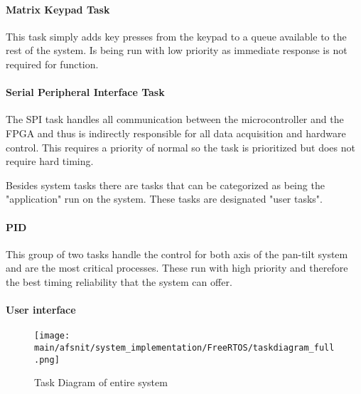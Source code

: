 \documentclass[../../../main]{subfiles}
\begin{document}
\paragraph{Matrix Keypad Task}

This task simply adds key presses from the keypad to a queue available to the rest of the system. Is being run with low priority as immediate response is not required for function.

\paragraph{Serial Peripheral Interface Task}

The SPI task handles all communication between the microcontroller and the FPGA and thus is indirectly responsible for all data acquisition and hardware control. This requires a priority of normal so the task is prioritized but does not require hard timing.  

Besides system tasks there are tasks that can be categorized as being the "application" run on the system. These tasks are designated "user tasks".

\paragraph{PID}

This group of two tasks handle the control for both axis of the pan-tilt system and are the most critical processes. These run with high priority and therefore the best timing reliability that the system can offer.

\paragraph{User interface}


\begin{figure}[H]
\texttt{[image: \\main/afsnit/system\_implementation/FreeRTOS/taskdiagram\_full.png]}
\caption{Task Diagram of entire system}
\label{fig:entire_task_diagram}
\end{figure}
\end{document}
